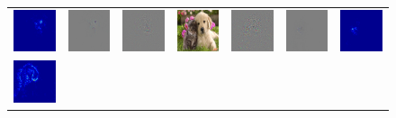 \setlength{\tabcolsep}{2pt}
\begin{figure}
\begin{center}
\begin{tabular}{ccccccc}
\includegraphics[width=0.13\linewidth]{figs/examples/googlenet/soft/dog-cat1_sali_258} &
\includegraphics[width=0.13\linewidth]{figs/examples/googlenet/soft/dog-cat1_diff_258} &
\includegraphics[width=0.13\linewidth]{figs/examples/googlenet/oxford/dog-cat1_diff_258} &
\includegraphics[width=0.13\linewidth]{figs/examples/googlenet/oxford/dog-cat1} &
\includegraphics[width=0.13\linewidth]{figs/examples/googlenet/oxford/dog-cat1_diff_286} &
\includegraphics[width=0.13\linewidth]{figs/examples/googlenet/soft/dog-cat1_diff_286} &
\includegraphics[width=0.13\linewidth]{figs/examples/googlenet/soft/dog-cat1_sali_286} \\
\includegraphics[width=0.13\linewidth]{figs/examples/googlenet/soft/dog-cat2_sali_163} &

\end{tabular}
\end{center}
\end{figure}

